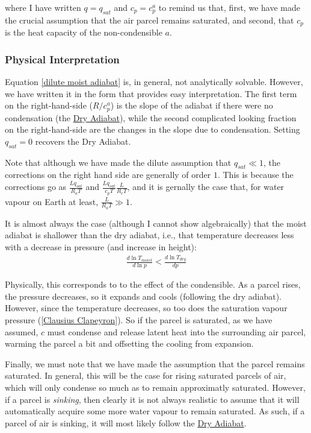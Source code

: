 where I have written $q=q_{sat}$ and $c_p=c_p^a$ to remind us that, first, we have made the crucial assumption that the air parcel remains saturated, and second, that $c_p$ is the heat capacity of the non-condensible $a$.

\subsubsection{Physical Interpretation}

Equation \ref{dilute moist adiabat} is, in general, not analytically solvable. However, we have written it in the form that provides easy interpretation. The first term on the right-hand-side ($R/c_p^a$) is the slope of the adiabat if there were no condensation (the \hyperref[Dry Adiabat]{Dry Adiabat}), while the second complicated looking fraction on the right-hand-side are the changes in the slope due to condensation. Setting $q_{sat}=0$ recovers the Dry Adiabat.

Note that although we have made the dilute assumption that $q_{sat}\ll 1$, the corrections on the right hand side are generally of order $1$. This is because the corrections go as $\frac{L q_{sat}}{R_a T}$ and $\frac{Lq_{sat}}{c_p T}\frac{L}{R_cT}$, and it is gernally the case that, for water vapour on Earth at least, $\frac{L}{R_a T}\gg 1$.

It is almost always the case (although I cannot show algebraically) that the moist adiabat is shallower than the dry adiabat, i.e., that temperature decreases less with a decrease in pressure (and increase in height): 
\begin{align*}
    \frac{d\ln T_{moist}}{d\ln p} < \frac{d\ln T_{dry}}{dp}
\end{align*}

Physically, this corresponds to to the effect of the condensible. As a parcel rises, the pressure decreases, so it expands and cools (following the dry adiabat). However, since the temperature decreases, so too does the saturation vapour pressure (\ref{Clausius Clapeyron}). So if the parcel is saturated, as we have assumed, $c$ must condense and release latent heat into the surrounding air parcel, warming the parcel a bit and offsetting the cooling from expansion.

Finally, we must note that we have made the assumption that the parcel remains saturated. In general, this will be the case for rising saturated parcels of air, which will only condense so much as to remain approximatly saturated. However, if a parcel is \textit{sinking}, then clearly it is not always realistic to assume that it will automatically acquire some more water vapour to remain saturated. As such, if a parcel of air is sinking, it will most likely follow the \hyperref[Dry Adiabat Box]{Dry Adiabat}. 

